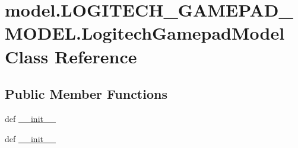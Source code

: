 \hypertarget{classmodel_1_1LOGITECH__GAMEPAD__MODEL_1_1LogitechGamepadModel}{}\section{model.\+L\+O\+G\+I\+T\+E\+C\+H\+\_\+\+G\+A\+M\+E\+P\+A\+D\+\_\+\+M\+O\+D\+E\+L.\+Logitech\+Gamepad\+Model Class Reference}
\label{classmodel_1_1LOGITECH__GAMEPAD__MODEL_1_1LogitechGamepadModel}
\subsection*{Public Member Functions}
\begin{DoxyCompactItemize}
\item 
def \hyperlink{classmodel_1_1LOGITECH__GAMEPAD__MODEL_1_1LogitechGamepadModel_a78c8eb4ec8b24bb9b7b3b5f8b89b1ae4}{\+\_\+\+\_\+init\+\_\+\+\_\+}
\item 
def \hyperlink{classmodel_1_1LOGITECH__GAMEPAD__MODEL_1_1LogitechGamepadModel_a78c8eb4ec8b24bb9b7b3b5f8b89b1ae4}{\+\_\+\+\_\+init\+\_\+\+\_\+}
\end{DoxyCompactItemize}
